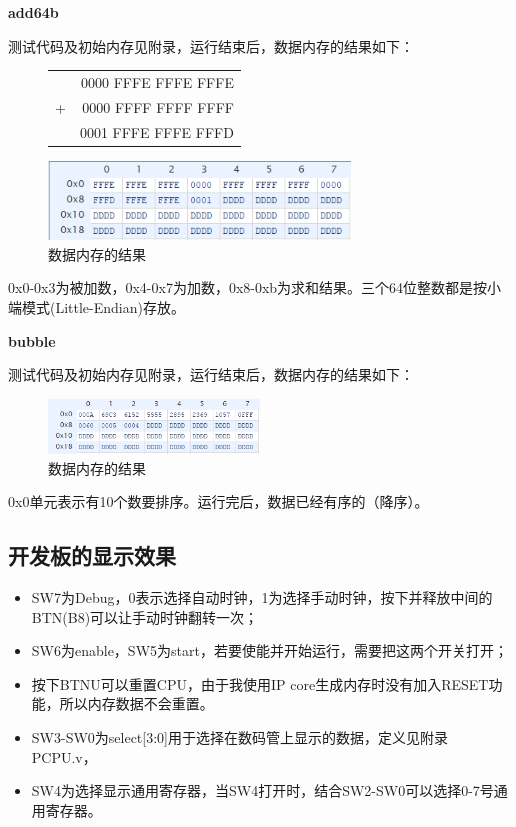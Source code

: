 \documentclass[10pt,a4paper,fleqn]{article}
\begin{document}
\par {\bf add64b}
\par 测试代码及初始内存见附录，运行结束后，数据内存的结果如下：
\begin{figure}[H]
\hspace{1em}
\begin{minipage}{0.25\textwidth}
\consolas
\begin{tabular}{rr}
  &0000 FFFE FFFE FFFE\\
 +&0000 FFFF FFFF FFFF\\
 \hline
  &0001 FFFE FFFE FFFD\\
\end{tabular}
\end{minipage}
\begin{minipage}{0.7\textwidth}
  \centering
  \includegraphics[width=0.714\textwidth]{figure/simu/advance/add64b.png}
  \caption{数据内存的结果}
\end{minipage}
\end{figure}
\par 0x0-0x3为被加数，0x4-0x7为加数，0x8-0xb为求和结果。三个64位整数都是按小端模式(Little-Endian)存放。

\par {\bf bubble}
\par 测试代码及初始内存见附录，运行结束后，数据内存的结果如下：
\begin{figure}[H]
  \centering
  \includegraphics[width=0.5\textwidth]{figure/simu/advance/bubble.png}
  \caption{数据内存的结果}
\end{figure}
\par 0x0单元表示有10个数要排序。运行完后，数据已经有序的（降序）。

\subsection{开发板的显示效果}
\begin{itemize}
  \item SW7为Debug，0表示选择自动时钟，1为选择手动时钟，按下并释放中间的BTN(B8)可以让手动时钟翻转一次；
  \item SW6为enable，SW5为start，若要使能并开始运行，需要把这两个开关打开；
  \item 按下BTNU可以重置CPU，由于我使用IP core生成内存时没有加入RESET功能，所以内存数据不会重置。
  \item SW3-SW0为select[3:0]用于选择在数码管上显示的数据，定义见附录PCPU.v，
  \item SW4为选择显示通用寄存器，当SW4打开时，结合SW2-SW0可以选择0-7号通用寄存器。
\end{itemize}
\end{document}
